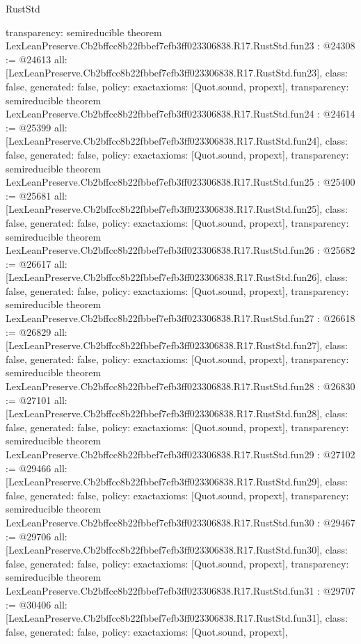 \begin{lexlean}{RustStd}
\begin{coremodule}
{  transparency: semireducible
}
theorem LexLeanPreserve.Cb2bffcc8b22fbbef7efb3ff023306838.R17.RustStd.fun23 : @24308 := @24613 {
  all: [LexLeanPreserve.Cb2bffcc8b22fbbef7efb3ff023306838.R17.RustStd.fun23],
  class: false,
  generated: false,
  policy: exact{axioms: [Quot.sound, propext]},
  transparency: semireducible
}
theorem LexLeanPreserve.Cb2bffcc8b22fbbef7efb3ff023306838.R17.RustStd.fun24 : @24614 := @25399 {
  all: [LexLeanPreserve.Cb2bffcc8b22fbbef7efb3ff023306838.R17.RustStd.fun24],
  class: false,
  generated: false,
  policy: exact{axioms: [Quot.sound, propext]},
  transparency: semireducible
}
theorem LexLeanPreserve.Cb2bffcc8b22fbbef7efb3ff023306838.R17.RustStd.fun25 : @25400 := @25681 {
  all: [LexLeanPreserve.Cb2bffcc8b22fbbef7efb3ff023306838.R17.RustStd.fun25],
  class: false,
  generated: false,
  policy: exact{axioms: [Quot.sound, propext]},
  transparency: semireducible
}
theorem LexLeanPreserve.Cb2bffcc8b22fbbef7efb3ff023306838.R17.RustStd.fun26 : @25682 := @26617 {
  all: [LexLeanPreserve.Cb2bffcc8b22fbbef7efb3ff023306838.R17.RustStd.fun26],
  class: false,
  generated: false,
  policy: exact{axioms: [Quot.sound, propext]},
  transparency: semireducible
}
theorem LexLeanPreserve.Cb2bffcc8b22fbbef7efb3ff023306838.R17.RustStd.fun27 : @26618 := @26829 {
  all: [LexLeanPreserve.Cb2bffcc8b22fbbef7efb3ff023306838.R17.RustStd.fun27],
  class: false,
  generated: false,
  policy: exact{axioms: [Quot.sound, propext]},
  transparency: semireducible
}
theorem LexLeanPreserve.Cb2bffcc8b22fbbef7efb3ff023306838.R17.RustStd.fun28 : @26830 := @27101 {
  all: [LexLeanPreserve.Cb2bffcc8b22fbbef7efb3ff023306838.R17.RustStd.fun28],
  class: false,
  generated: false,
  policy: exact{axioms: [Quot.sound, propext]},
  transparency: semireducible
}
theorem LexLeanPreserve.Cb2bffcc8b22fbbef7efb3ff023306838.R17.RustStd.fun29 : @27102 := @29466 {
  all: [LexLeanPreserve.Cb2bffcc8b22fbbef7efb3ff023306838.R17.RustStd.fun29],
  class: false,
  generated: false,
  policy: exact{axioms: [Quot.sound, propext]},
  transparency: semireducible
}
theorem LexLeanPreserve.Cb2bffcc8b22fbbef7efb3ff023306838.R17.RustStd.fun30 : @29467 := @29706 {
  all: [LexLeanPreserve.Cb2bffcc8b22fbbef7efb3ff023306838.R17.RustStd.fun30],
  class: false,
  generated: false,
  policy: exact{axioms: [Quot.sound, propext]},
  transparency: semireducible
}
theorem LexLeanPreserve.Cb2bffcc8b22fbbef7efb3ff023306838.R17.RustStd.fun31 : @29707 := @30406 {
  all: [LexLeanPreserve.Cb2bffcc8b22fbbef7efb3ff023306838.R17.RustStd.fun31],
  class: false,
  generated: false,
  policy: exact{axioms: [Quot.sound, propext]},
}
\end{coremodule}
\end{lexlean}
